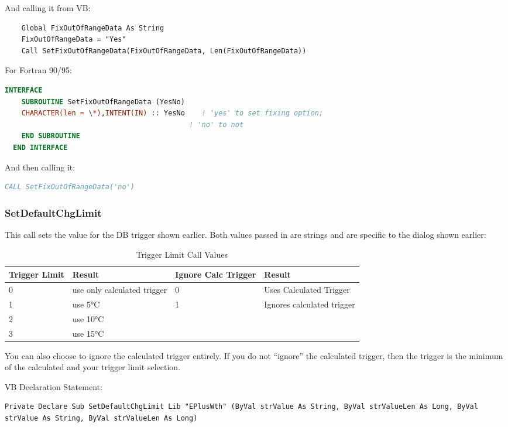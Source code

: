 And calling it from VB:

\begin{lstlisting}
    Global FixOutOfRangeData As String
    FixOutOfRangeData = "Yes"
    Call SetFixOutOfRangeData(FixOutOfRangeData, Len(FixOutOfRangeData))
\end{lstlisting}

For Fortran 90/95:

\begin{lstlisting}[language=Fortran]
  INTERFACE
    SUBROUTINE SetFixOutOfRangeData (YesNo)
    CHARACTER(len = \*),INTENT(IN) :: YesNo    ! 'yes' to set fixing option;
                                            ! 'no' to not
    END SUBROUTINE
  END INTERFACE
\end{lstlisting}

And then calling it:

\begin{lstlisting}[language=Fortran]
CALL SetFixOutOfRangeData('no')
\end{lstlisting}

\subsubsection{SetDefaultChgLimit}\label{setdefaultchglimit}

This call sets the value for the DB trigger shown earlier. Both values passed in are strings and are specific to the dialog shown earlier:

\begin{longtable}[c]{p{1.5in}p{1.5in}p{1.5in}p{1.5in}}
\caption{Trigger Limit Call Values \protect \label{table:trigger-limit-call-values}}\\
\toprule 
Trigger    Limit & Result & Ignore    Calc    Trigger & Result \tabularnewline \midrule
\endhead
0 & use only calculated trigger & 0 & Uses Calculated Trigger \tabularnewline
1 & use 5°C & 1 & Ignores calculated trigger \tabularnewline
2 & use 10°C &  &  \tabularnewline
3 & use 15°C &  &  \tabularnewline
\bottomrule
\end{longtable}

You can also choose to ignore the calculated trigger entirely. If you do not ``ignore'' the calculated trigger, then the trigger is the minimum of the calculated and your trigger limit selection.

VB Declaration Statement:

\begin{lstlisting}
Private Declare Sub SetDefaultChgLimit Lib "EPlusWth" (ByVal strValue As String, ByVal strValueLen As Long, ByVal strValue As String, ByVal strValueLen As Long)
\end{lstlisting}

